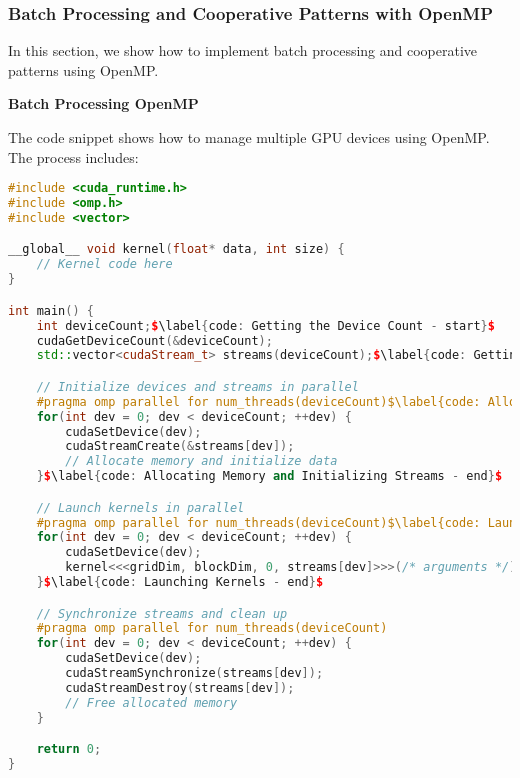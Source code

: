 \subsubsection{Batch Processing and Cooperative Patterns with OpenMP}

In this section, we show how to implement batch processing and cooperative patterns using OpenMP.

\begin{flushleft}
   \textcolor{Green3}{ \textbf{Batch Processing OpenMP}}
\end{flushleft}
The code snippet shows how to manage multiple GPU devices using OpenMP. The process includes:
\begin{lstlisting}[language=C++, mathescape=true]
#include <cuda_runtime.h>
#include <omp.h>
#include <vector>

__global__ void kernel(float* data, int size) {
    // Kernel code here
}

int main() {
    int deviceCount;$\label{code: Getting the Device Count - start}$
    cudaGetDeviceCount(&deviceCount);
    std::vector<cudaStream_t> streams(deviceCount);$\label{code: Getting the Device Count - end}$

    // Initialize devices and streams in parallel
    #pragma omp parallel for num_threads(deviceCount)$\label{code: Allocating Memory and Initializing Streams - start}$
    for(int dev = 0; dev < deviceCount; ++dev) {
        cudaSetDevice(dev);
        cudaStreamCreate(&streams[dev]);
        // Allocate memory and initialize data
    }$\label{code: Allocating Memory and Initializing Streams - end}$

    // Launch kernels in parallel
    #pragma omp parallel for num_threads(deviceCount)$\label{code: Launching Kernels - start}$
    for(int dev = 0; dev < deviceCount; ++dev) {
        cudaSetDevice(dev);
        kernel<<<gridDim, blockDim, 0, streams[dev]>>>(/* arguments */);
    }$\label{code: Launching Kernels - end}$

    // Synchronize streams and clean up
    #pragma omp parallel for num_threads(deviceCount)
    for(int dev = 0; dev < deviceCount; ++dev) {
        cudaSetDevice(dev);
        cudaStreamSynchronize(streams[dev]);
        cudaStreamDestroy(streams[dev]);
        // Free allocated memory
    }

    return 0;
}
\end{lstlisting}
